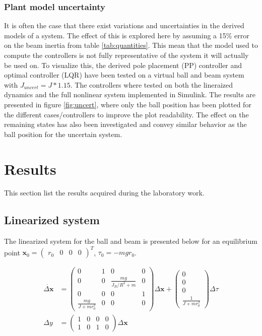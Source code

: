 \documentclass[a4paper, titlepage]{article}
\begin{document}
\subsubsection{Plant model uncertainty}
It is often the case that there exist variations and uncertainties in the derived models of a system.
The effect of this is explored here by assuming a 15\% error on the beam inertia from table \ref{tab:quantities}.
This mean that the model used to compute the controllers is not fully representative of the system it will actually be used on.
To visualize this, the derived pole placement (PP) controller and optimal controller (LQR) have been tested on a virtual ball and beam system with $J_{uncert} = J*1.15$.
The controllers where tested on both the lineraized dynamics and the full nonlinear system implemented in Simulink.
The results are presented in figure \ref{fig:uncert}, where only the ball position has been plotted for the different cases/controllers to improve the plot readability.
The effect on the remaining states has also been investigated and convey similar behavior as the ball position for the uncertain system.


\section{Results}
This section list the results acquired during the laboratory work.

\subsection{Linearized system}
The linearized system for the ball and beam is presented below for an equilibrium point $\textbf{x}_0 = \begin{pmatrix} r_0 & 0 & 0 & 0 \end{pmatrix}^T$, $\tau_0 = -mgr_0$.

\begin{equation}
\begin{split}
\dot{\Delta\textbf{x}} &= 
\begin{pmatrix}
0 & 1 & 0 & 0 \\
0 & 0 & \frac{mg}{J_R/R^2 + m} & 0 \\
0 & 0 & 0 & 1 \\
\frac{mg}{J + mr_0^2} & 0 & 0 & 0
\end{pmatrix}\Delta\textbf{x} + \begin{pmatrix}
0 \\ 0 \\ 0 \\ \frac{1}{J + mr_0^2}
\end{pmatrix}\Delta\tau \\
\Delta y &= \begin{pmatrix}
1 & 0 & 0 & 0 \\
1 & 0 & 1 & 0
\end{pmatrix}\Delta\textbf{x}
\end{split}
\label{equ:linSys}
\end{equation}
\end{document}
